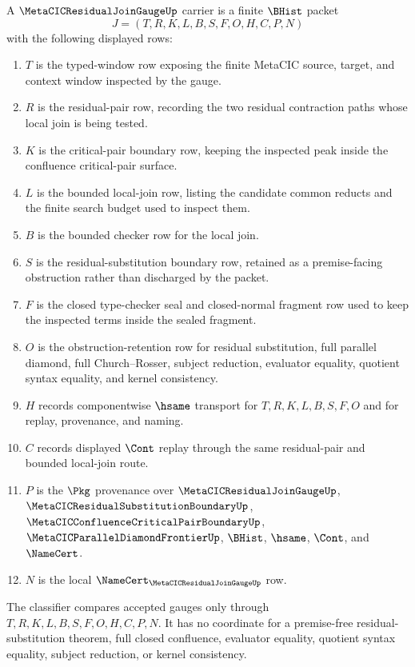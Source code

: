 \begin{definition}
\label{def:metacic-residual-join-gauge-carrier}
A $\MetaCICResidualJoinGaugeUp$ carrier is a finite $\BHist$ packet
$$
J=(T,R,K,L,B,S,F,O,H,C,P,N)
$$
with the following displayed rows:
\begin{enumerate}
\item $T$ is the typed-window row exposing the finite MetaCIC source, target, and context window inspected by the gauge.
\item $R$ is the residual-pair row, recording the two residual contraction paths whose local join is being tested.
\item $K$ is the critical-pair boundary row, keeping the inspected peak inside the confluence critical-pair surface.
\item $L$ is the bounded local-join row, listing the candidate common reducts and the finite search budget used to inspect them.
\item $B$ is the bounded checker row for the local join.
\item $S$ is the residual-substitution boundary row, retained as a premise-facing obstruction rather than discharged by the packet.
\item $F$ is the closed type-checker seal and closed-normal fragment row used to keep the inspected terms inside the sealed fragment.
\item $O$ is the obstruction-retention row for residual substitution, full parallel diamond, full Church--Rosser, subject reduction, evaluator equality, quotient syntax equality, and kernel consistency.
\item $H$ records componentwise $\hsame$ transport for $T,R,K,L,B,S,F,O$ and for replay, provenance, and naming.
\item $C$ records displayed $\Cont$ replay through the same residual-pair and bounded local-join route.
\item $P$ is the $\Pkg$ provenance over $\MetaCICResidualJoinGaugeUp$, $\MetaCICResidualSubstitutionBoundaryUp$, $\MetaCICConfluenceCriticalPairBoundaryUp$, $\MetaCICParallelDiamondFrontierUp$, $\BHist$, $\hsame$, $\Cont$, and $\NameCert$.
\item $N$ is the local $\NameCert_{\MetaCICResidualJoinGaugeUp}$ row.
\end{enumerate}
The classifier compares accepted gauges only through $T,R,K,L,B,S,F,O,H,C,P,N$. It has no coordinate for a premise-free residual-substitution theorem, full closed confluence, evaluator equality, quotient syntax equality, subject reduction, or kernel consistency.
\end{definition}

